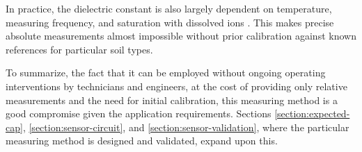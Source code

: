 In practice, the dielectric constant is also largely dependent on temperature, measuring frequency, and saturation with dissolved ions \cite{meter_group_soil_2023,podest_applications_nodate}. This makes precise absolute measurements almost impossible without prior calibration against known references for particular soil types.

To summarize, the fact that it can be employed without ongoing operating interventions by technicians and engineers, at the cost of providing only relative measurements and the need for initial calibration, this measuring method is a good compromise given the application requirements. Sections \ref{section:expected-cap}, \ref{section:sensor-circuit}, and \ref{section:sensor-validation}, where the particular measuring method is designed and validated, expand upon this.
